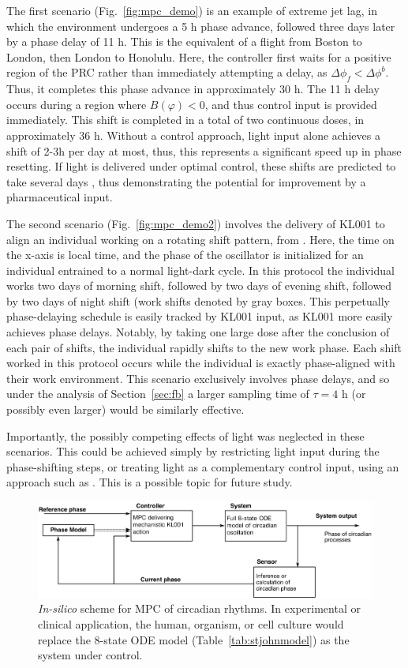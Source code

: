 The first scenario (Fig.~\ref{fig:mpc_demo}) is an example of extreme jet lag, in which the environment undergoes a 5 h phase advance, followed three days later by a phase delay of 11 h.
This is the equivalent of a flight from Boston to London, then London to Honolulu.
Here, the controller first waits for a positive region of the PRC rather than immediately attempting a delay, as $\Delta\phi_f < \Delta\phi^b$.
Thus, it completes this phase advance in approximately 30 h.
The 11 h delay occurs during a region where $B(\varphi)<0$, and thus control input is provided immediately.
This shift is completed in a total of two continuous doses, in approximately 36 h.
Without a control approach, light input alone achieves a shift of 2-3h per day at most, thus, this represents a significant speed up in phase resetting.
If light is delivered under optimal control, these shifts are predicted to take several days \cite{Serkh2014}, thus demonstrating the potential for improvement by a pharmaceutical input.

The second scenario (Fig.~\ref{fig:mpc_demo2}) involves the delivery of KL001 to align an individual working on a rotating shift pattern, from \cite{Vetter2015}.
Here, the time on the x-axis is local time, and the phase of the oscillator is initialized for an individual entrained to a normal light-dark cycle.
In this protocol the individual works two days of morning shift, followed by two days of evening shift, followed by two days of night shift (work shifts denoted by gray boxes.
This perpetually phase-delaying schedule is easily tracked by KL001 input, as KL001 more easily achieves phase delays.
Notably, by taking one large dose after the conclusion of each pair of shifts, the individual rapidly shifts to the new work phase.
Each shift worked in this protocol occurs while the individual is exactly phase-aligned with their work environment.
This scenario exclusively involves phase delays, and so under the analysis of Section~\ref{sec:fb} a larger sampling time of $\tau = 4$ h (or possibly even larger) would be similarly effective.

Importantly, the possibly competing effects of light was neglected in these scenarios.
This could be achieved simply by restricting light input during the phase-shifting steps, or treating light as a complementary control input, using an approach such as \cite{Julius2017}.
This is a possible topic for future study.

\begin{figure}[p!]
	\centering
    \includegraphics[width=7in]{chap6/figures/figure_2.png}
    \caption{\label{fig:scheme} \textit{In-silico} scheme for MPC of circadian rhythms. In experimental or clinical application, the human, organism, or cell culture would replace the 8-state ODE model (Table~\ref{tab:stjohnmodel}) as the system under control.}
\end{figure}

